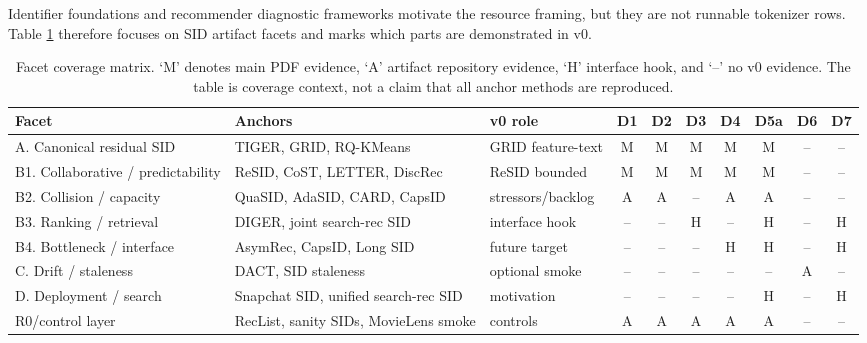 Identifier foundations and recommender diagnostic frameworks motivate the
resource framing, but they are not runnable tokenizer rows. Table
\ref{tab:method-coverage} therefore focuses on SID artifact facets and marks
which parts are demonstrated in v0.

\begin{table}[t]
\caption{Facet coverage matrix. `M' denotes main PDF evidence, `A' artifact
repository evidence, `H' interface hook, and `--' no v0 evidence. The table is
coverage context, not a claim that all anchor methods are reproduced.}
\label{tab:method-coverage}
\footnotesize
\setlength{\tabcolsep}{3.2pt}
\begin{tabular}{@{}p{}p{}p{}ccccccc@{}}
\toprule
Facet & Anchors & v0 role & D1 & D2 & D3 & D4 & D5a & D6 & D7 \\
\midrule
A. Canonical residual SID & TIGER, GRID, RQ-KMeans & GRID feature-text & M & M & M & M & M & -- & -- \\
B1. Collaborative / predictability & ReSID, CoST, LETTER, DiscRec & ReSID bounded & M & M & M & M & M & -- & -- \\
B2. Collision / capacity & QuaSID, AdaSID, CARD, CapsID & stressors/backlog & A & A & -- & A & A & -- & -- \\
B3. Ranking / retrieval & DIGER, joint search-rec SID & interface hook & -- & -- & H & -- & H & -- & H \\
B4. Bottleneck / interface & AsymRec, CapsID, Long SID & future target & -- & -- & -- & H & H & -- & H \\
C. Drift / staleness & DACT, SID staleness & optional smoke & -- & -- & -- & -- & -- & A & -- \\
D. Deployment / search & Snapchat SID, unified search-rec SID & motivation & -- & -- & -- & -- & H & -- & H \\
R0/control layer & RecList, sanity SIDs, MovieLens smoke & controls & A & A & A & A & A & -- & -- \\
\bottomrule
\end{tabular}
\end{table}
